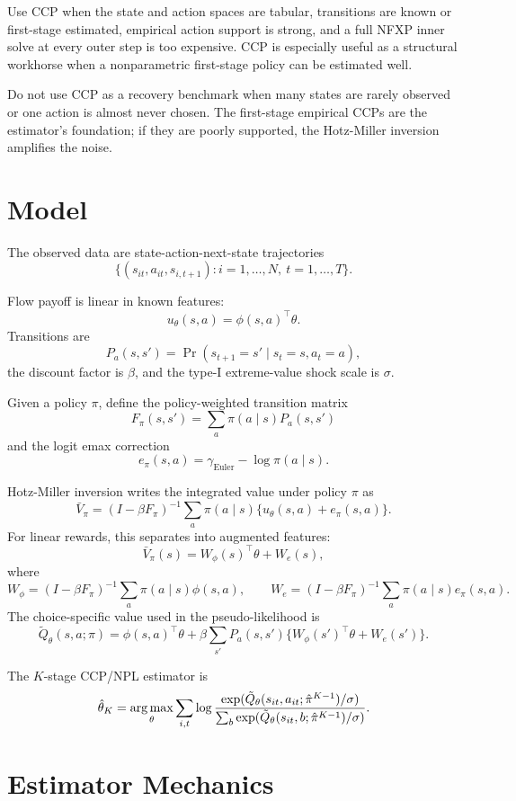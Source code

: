 \documentclass[10pt]{article}
\begin{document}
Use CCP when the state and action spaces are tabular, transitions are known or
first-stage estimated, empirical action support is strong, and a full NFXP
inner solve at every outer step is too expensive. CCP is especially useful as a
structural workhorse when a nonparametric first-stage policy can be estimated
well.

Do not use CCP as a recovery benchmark when many states are rarely observed or
one action is almost never chosen. The first-stage empirical CCPs are the
estimator's foundation; if they are poorly supported, the Hotz-Miller inversion
amplifies the noise.

\section{Model}

The observed data are state-action-next-state trajectories
\[
\{(s_{it}, a_{it}, s_{i,t+1}) : i=1,\ldots,N,\ t=1,\ldots,T\}.
\]

Flow payoff is linear in known features:
\[
u_\theta(s,a) = \phi(s,a)^\top \theta.
\]
Transitions are
\[
P_a(s,s') = \Pr(s_{t+1}=s' \mid s_t=s, a_t=a),
\]
the discount factor is \(\beta\), and the type-I extreme-value shock scale is
\(\sigma\).

Given a policy \(\pi\), define the policy-weighted transition matrix
\[
F_\pi(s,s') = \sum_a \pi(a\mid s)P_a(s,s')
\]
and the logit emax correction
\[
e_\pi(s,a) = \gamma_{\mathrm{Euler}} - \log \pi(a\mid s).
\]

Hotz-Miller inversion writes the integrated value under policy \(\pi\) as
\[
\bar V_\pi
=
(I-\beta F_\pi)^{-1}
\sum_a \pi(a\mid s)\{u_\theta(s,a)+e_\pi(s,a)\}.
\]
For linear rewards, this separates into augmented features:
\[
\bar V_\pi(s)
=
W_\phi(s)^\top\theta + W_e(s),
\]
where
\[
W_\phi = (I-\beta F_\pi)^{-1}\sum_a \pi(a\mid s)\phi(s,a),
\qquad
W_e = (I-\beta F_\pi)^{-1}\sum_a \pi(a\mid s)e_\pi(s,a).
\]
The choice-specific value used in the pseudo-likelihood is
\[
\tilde Q_\theta(s,a;\pi)
=
\phi(s,a)^\top\theta
+ \beta \sum_{s'}P_a(s,s')\{W_\phi(s')^\top\theta+W_e(s')\}.
\]

The \(K\)-stage CCP/NPL estimator is
\[
\hat\theta_K
=
\operatorname*{arg\,max}_\theta
\sum_{i,t}
\log
\frac{\exp(\tilde Q_\theta(s_{it},a_{it};\hat\pi^{K-1})/\sigma)}
{\sum_b\exp(\tilde Q_\theta(s_{it},b;\hat\pi^{K-1})/\sigma)}.
\]

\section{Estimator Mechanics}
\end{document}
